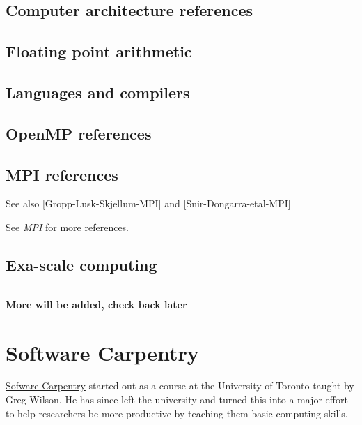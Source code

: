 \documentclass[letterpaper,10pt,english]{sphinxmanual}
\begin{document}
\subsection{Computer architecture references}
\label{biblio:computer-architecture-references}\label{biblio:biblio-computer-arch}

\subsection{Floating point arithmetic}
\label{biblio:floating-point-arithmetic}

\subsection{Languages and compilers}
\label{biblio:languages-and-compilers}

\subsection{OpenMP references}
\label{biblio:biblio-openmp}\label{biblio:openmp-references}

\subsection{MPI references}
\label{biblio:biblio-mpi}\label{biblio:mpi-references}
See also {[}Gropp-Lusk-Skjellum-MPI{]} and  {[}Snir-Dongarra-etal-MPI{]}

See {\hyperref[mpi:mpi]{\emph{MPI}}} for more references.


\subsection{Exa-scale computing}
\label{biblio:exa-scale-computing}

\bigskip\hrule{}\bigskip


\textbf{More will be added, check back later}


\section{Software Carpentry}
\label{software_carpentry:software-carpentry}\label{software_carpentry::doc}\label{software_carpentry:id1}
\href{http://software-carpentry.org}{Sofware Carpentry}
started out as a course at the University of Toronto
taught by Greg Wilson.  He has since left the university and turned this
into a major effort to help researchers be more productive by teaching them
basic computing skills.
\end{document}
